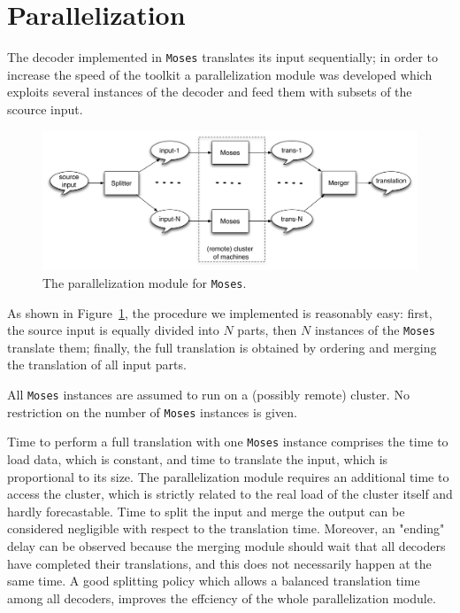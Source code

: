 \documentclass[11pt]{report}
\theoremstyle{plain}
\begin{document}
{\section{Parallelization}
The decoder implemented in {\tt Moses} translates its input sequentially; in order to increase 
the speed of the toolkit a parallelization module was developed which exploits several instances of the decoder and feed them with subsets of the scource input.


\begin{figure}
\begin{center}
 \includegraphics[width=\columnwidth]{Moses-parallel}
\caption{The parallelization module for {\tt Moses}.}
\label{fig:parallel}
\end{center}
 \end{figure}
 
As shown in Figure~\ref{fig:parallel}, the procedure we implemented is reasonably easy:
first, the source input is equally divided into $N$ parts, then $N$ instances of the {\tt Moses} translate them; finally, the full translation is obtained by ordering and merging the translation of all input parts.

All {\tt Moses} instances are assumed to run on a (possibly remote) cluster. No restriction on the number of {\tt Moses} instances is given.


Time to perform a full translation with one {\tt Moses} instance comprises the time to load data, which is constant, and time to translate the input, which is proportional to its size.
The parallelization module requires an additional time to access the cluster, which is strictly related to the real load of the cluster itself and hardly forecastable.
Time to split the input and merge the output can be considered negligible with respect to the translation time.
Moreover, an "ending" delay can be observed because the merging module should wait that all decoders have completed their translations, and this does not necessarily happen at the same time. A good splitting policy which allows a balanced translation time among all decoders,  improves the effciency of the whole parallelization module.

}
\end{document}
